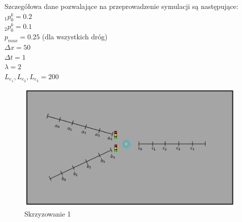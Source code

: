 \documentclass[12pt]{book}
\begin{document}
Szczegółowa dane pozwalające na przeprowadzenie symulacji są następujące: \\
$_1p_{0}^k=0.2$ \\
$_2p_{0}^k=0.1$ \\
$p_{max}=0.25$ (dla wszystkich dróg)\\
$\Delta x=50$\\
$\Delta t=1$ \\
$\lambda=2$ \\
$L_{e_1},L_{e_2},L_{e_3}=200$
\begin{figure}[H]
  \centering
    \includegraphics[width=14cm]{skrz_1_discret}
 \caption{Skrzyzowanie 1}
 \label{fig:skrz_1}
\end{figure}







\end{document}
